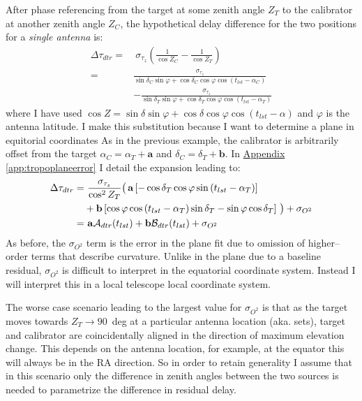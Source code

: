 		After phase referencing from the target at some zenith angle $Z_T$ to the calibrator at another zenith angle $Z_C$, the hypothetical delay difference for the two positions for a \textit{single antenna} is:
		\begin{equation}
			\begin{split}
			\Delta\tau_{dtr}=&~ \sigma_{\tau_z} \left(\frac{1}{\cos Z_C}-\frac{1}{\cos Z_T}\right)\\
							=&  \frac{\sigma_{\tau_z}}{\sin\delta_C\sin\varphi+\cos\delta_C\cos\varphi\cos(t_{lst}-\alpha_C)} \\
							 &-\frac{\sigma_{\tau_z}}{\sin\delta_T\sin\varphi+\cos\delta_T\cos\varphi\cos(t_{lst}-\alpha_T)}
			\end{split}
		\end{equation} where I have used $\cos Z=\sin\delta\sin\varphi+\cos\delta\cos\varphi\cos(t_{lst}-\alpha)$ and $\varphi$ is the antenna latitude. I make this substitution because I want to determine a plane in equitorial coordinates As in the previous example, the calibrator is arbitrarily offset from the target $\alpha_C=\alpha_T+\textbf{a}$ and $\delta_C=\delta_T+\textbf{b}$. In \hyperref[app:tropoplaneerror]{Appendix \ref*{app:tropoplaneerror}} I detail the expansion leading to:
		\begin{equation}
			\begin{split}
			\Delta\tau_{dtr}=&~\frac{\sigma_{\tau_z}}{\cos^2 Z_T} \big(\,\textbf{a}\left[-\cos\delta_T\cos\varphi\sin\left(t_{lst}-\alpha_T\right)\right] \\
					    	 &+ \textbf{b}\left[\cos\varphi\cos\left(t_{lst}-\alpha_T\right)\sin\delta_T-\sin\varphi\cos\delta_T\right]\,\big) + \sigma_{O^2}\\ 
							=&~{\bf a} \mathcal{A}_{dtr}(t_{lst}) + {\bf b}\mathcal{B}_{dtr}(t_{lst})+\sigma_{O^2}
			\end{split}
			\label{eq:troposplane}
		\end{equation}
		As before, the $\sigma_{O^2}$ term is the error in the plane fit due to omission of higher--order terms that describe curvature. Unlike in the plane due to a baseline residual, $\sigma_{O^2}$ is difficult to interpret in the equatorial coordinate system. Instead I will interpret this in a local telescope local coordinate system. 
		
		The worse case scenario leading to the largest value for $\sigma_{O^2}$ is that as the target moves towards $Z_T\rightarrow90$~deg at a particular antenna location (aka. sets), target and calibrator are coincidentally aligned in the direction of maximum elevation change. This depends on the antenna location, for example, at the equator this will always be in the RA direction. So in order to retain generality I assume that in this scenario only the difference in zenith angles between the two sources is needed to parametrize the difference in residual delay.
		
